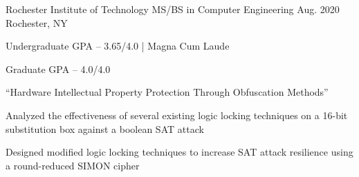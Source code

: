 
\begin{cventries}
	\cvexperience
	{Rochester Institute of Technology}
	{MS/BS in Computer Engineering}
	{Aug. 2020}
	{Rochester, NY}
	{
		\begin{cvitems}
		\item {Undergraduate GPA -- 3.65/4.0 | Magna Cum Laude}
		\item {Graduate GPA -- 4.0/4.0}
		\end{cvitems}
	}

	\cvthesis
	{``Hardware Intellectual Property Protection Through Obfuscation Methods'' \normalfont{\color{awesome}\ | } }
	{}
	{
		\begin{cvitems}
		\item Analyzed the effectiveness of several existing logic locking techniques on a 16-bit substitution box against a boolean SAT attack
		\item Designed modified logic locking techniques to increase SAT attack resilience using a round-reduced SIMON cipher
		\end{cvitems}
	}
\end{cventries}

